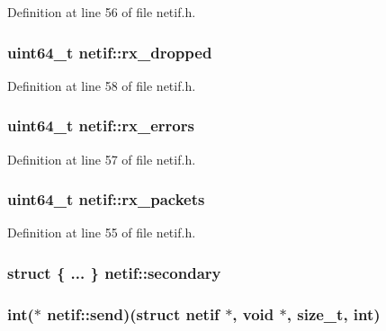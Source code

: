 Definition at line 56 of file netif.\+h.

\hypertarget{structnetif_a1fc7320d2883ee21c7fe0fd954a70887}{
\subsubsection[{rx\+\_\+dropped}]{\setlength{\rightskip}{0pt plus 5cm}uint64\+\_\+t netif\+::rx\+\_\+dropped}}\label{structnetif_a1fc7320d2883ee21c7fe0fd954a70887}


Definition at line 58 of file netif.\+h.

\hypertarget{structnetif_adb3c694759403e67d539a5e81a552c92}{
\subsubsection[{rx\+\_\+errors}]{\setlength{\rightskip}{0pt plus 5cm}uint64\+\_\+t netif\+::rx\+\_\+errors}}\label{structnetif_adb3c694759403e67d539a5e81a552c92}


Definition at line 57 of file netif.\+h.

\hypertarget{structnetif_a80040f58867713ff1b5ec982a450221e}{
\subsubsection[{rx\+\_\+packets}]{\setlength{\rightskip}{0pt plus 5cm}uint64\+\_\+t netif\+::rx\+\_\+packets}}\label{structnetif_a80040f58867713ff1b5ec982a450221e}


Definition at line 55 of file netif.\+h.

\hypertarget{structnetif_a793ad0cb27997bfa7874a2097a77b0e2}{
\subsubsection[{secondary}]{\setlength{\rightskip}{0pt plus 5cm}struct \{ ... \}   netif\+::secondary}}\label{structnetif_a793ad0cb27997bfa7874a2097a77b0e2}
\hypertarget{structnetif_ac0505ae55088f68c2cefa77dc6871208}{
\subsubsection[{send}]{\setlength{\rightskip}{0pt plus 5cm}int($\ast$ netif\+::send)(struct {\bf netif} $\ast$, void $\ast$, size\+\_\+t, int)}}\label{structnetif_ac0505ae55088f68c2cefa77dc6871208}


